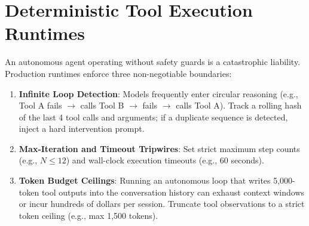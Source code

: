 \section{Deterministic Tool Execution Runtimes}

An autonomous agent operating without safety guards is a catastrophic liability. Production runtimes enforce three non-negotiable boundaries:

\begin{enumerate}[leftmargin=18pt]
  \item \textbf{Infinite Loop Detection}: Models frequently enter circular reasoning (e.g., Tool A fails $\to$ calls Tool B $\to$ fails $\to$ calls Tool A). Track a rolling hash of the last 4 tool calls and arguments; if a duplicate sequence is detected, inject a hard intervention prompt.
  \item \textbf{Max-Iteration and Timeout Tripwires}: Set strict maximum step counts (e.g., $N \le 12$) and wall-clock execution timeouts (e.g., 60 seconds).
  \item \textbf{Token Budget Ceilings}: Running an autonomous loop that writes 5,000-token tool outputs into the conversation history can exhaust context windows or incur hundreds of dollars per session. Truncate tool observations to a strict token ceiling (e.g., max 1,500 tokens).
\end{enumerate}

